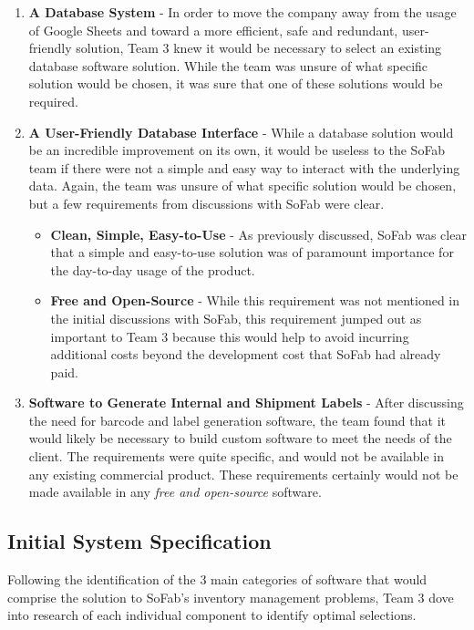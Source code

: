 \documentclass{article}
\begin{document}
\begin{enumerate}
    \item \textbf{A Database System} - In order to move the company away from the usage of Google Sheets and toward a more efficient, 
        safe and redundant, user-friendly solution, Team 3 knew it would be necessary to select an existing database software solution.
        While the team was unsure of what specific solution would be chosen, it was sure that one of these solutions would be required.
    \item \textbf{A User-Friendly Database Interface} - While a database solution would be an incredible improvement on its own, it 
        would be useless to the SoFab team if there were not a simple and easy way to interact with the underlying data. Again, the team
        was unsure of what specific solution would be chosen, but a few requirements from discussions with SoFab were clear. 
        \begin{itemize}
            \item \textbf{Clean, Simple, Easy-to-Use} - As previously discussed, SoFab was clear that a simple and easy-to-use solution
                was of paramount importance for the day-to-day usage of the product. 
            \item \textbf{Free and Open-Source} - While this requirement was not mentioned in the initial discussions with SoFab, this 
                requirement jumped out as important to Team 3 because this would help to avoid incurring additional costs beyond the 
                development cost that SoFab had already paid. 
        \end{itemize}
    \item \textbf{Software to Generate Internal and Shipment Labels} - After discussing the need for barcode and label generation software,
        the team found that it would likely be necessary to build custom software to meet the needs of the client. The requirements were 
        quite specific, and would not be available in any existing commercial product. These requirements certainly would not be made 
        available in any \textit{free and open-source} software.
\end{enumerate}
\subsection{Initial System Specification}
\label{sec:init-sys-specs}
Following the identification of the 3 main categories of software that would comprise the solution to SoFab's inventory management 
problems, Team 3 dove into research of each individual component to identify optimal selections. 
\end{document}
